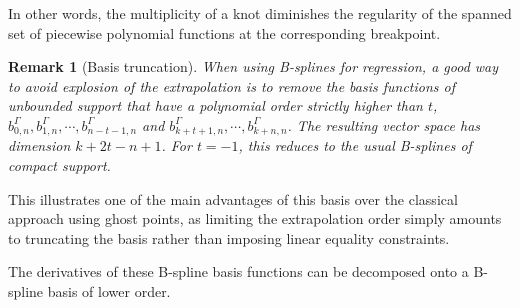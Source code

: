 \documentclass[a4paper]{article}
\newtheorem*{remark}{Remark}
\newcommand{\1}{\textbf{1}}
\begin{document}
\par \noindent In other words, the multiplicity of a knot diminishes the regularity of the spanned set of piecewise polynomial functions at the corresponding breakpoint.
\begin{remark}[Basis truncation]
\par When using B-splines for regression, a good way to avoid explosion of the extrapolation is to remove the basis functions of unbounded support that have a polynomial order strictly higher than $t$, $b^\Gamma_{0,n}, b^\Gamma_{1,n}, \cdots, b^\Gamma_{n - t - 1,n}$ and $b^\Gamma_{k + t + 1, n}, \cdots, b^\Gamma_{k + n, n}$.
The resulting vector space has dimension $k + 2 t - n + 1$. For $t=-1$, this reduces to the usual B-splines of compact support. 
\end{remark}
\par \noindent This illustrates one of the main advantages of this basis over the classical approach using ghost points, as limiting the extrapolation order simply amounts to truncating the basis rather than imposing linear equality constraints. 
\vspace{2mm}
\par \noindent The derivatives of these B-spline basis functions can be decomposed onto a B-spline basis of lower order. 
\end{document}
